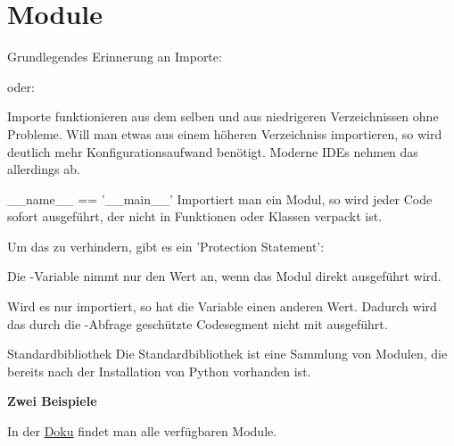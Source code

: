 \section{Module}
\begin{frame}{Grundlegendes}
	Erinnerung an Importe:
	
	oder:
	
	\pause
	Importe funktionieren aus dem selben und aus niedrigeren Verzeichnissen ohne Probleme. Will man etwas aus einem höheren Verzeichniss importieren, so wird deutlich mehr Konfigurationsaufwand benötigt. Moderne IDEs nehmen das allerdings ab.	
\end{frame}

\begin{frame}{\_\_name\_\_ == '\_\_main\_\_'}
	Importiert man ein Modul, so wird jeder Code sofort ausgeführt, der nicht in Funktionen oder Klassen verpackt ist.
	
	Um das zu verhindern, gibt es ein 'Protection Statement':
	
	\pause
	Die -Variable nimmt nur den Wert  an, wenn das Modul direkt ausgeführt wird. 
	
	Wird es nur importiert, so hat die Variable einen anderen Wert. Dadurch wird das durch die -Abfrage geschützte Codesegment nicht mit ausgeführt.
\end{frame}

\begin{frame}{Standardbibliothek}
	Die Standardbibliothek ist eine Sammlung von Modulen, die bereits nach der Installation von Python vorhanden ist.
	
	\textbf{Zwei Beispiele}
	
	
	
	In der \alert{\href{https://docs.python.org/3/library/}{Doku}} findet man alle verfügbaren Module.
\end{frame}

